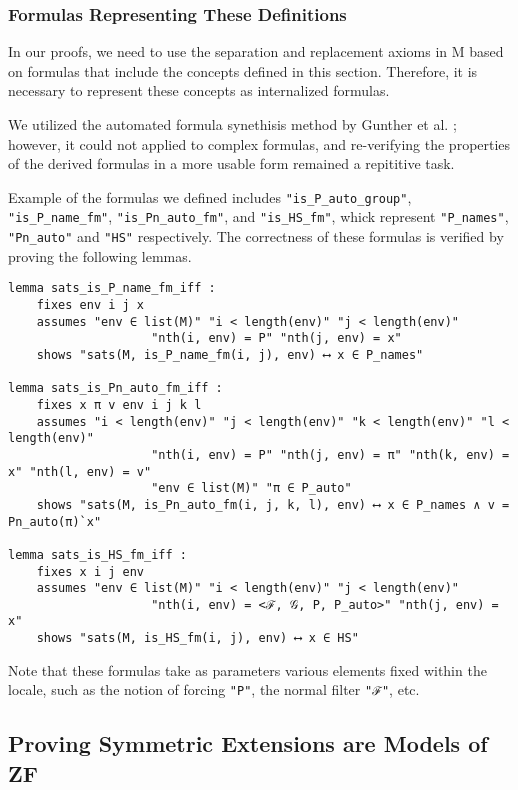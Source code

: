 \documentclass{report}
\newenvironment{isaframe}{\begin{mdframed}[topline=false, rightline=false, bottomline=false]}{\end{mdframed}}
\begin{document}
\subsubsection{Formulas Representing These Definitions}
In our proofs, we need to use the separation and replacement axioms in M
based on formulas that include the concepts defined in this section.
Therefore, it is necessary to represent these concepts as internalized formulas.

We utilized the automated formula synethisis method by Gunther et al. \cite{gunther_forcing};
however, it could not applied to complex formulas, 
and re-verifying the properties of the derived formulas in a more usable form remained a repititive task.

Example of the formulas we defined includes \texttt{"is\_P\_auto\_group"}, \texttt{"is\_P\_name\_fm"}, \texttt{"is\_Pn\_auto\_fm"}, and \texttt{"is\_HS\_fm"},
whick represent \texttt{"P\_names"}, \texttt{"Pn\_auto"} and \texttt{"HS"} respectively.
The correctness of these formulas is verified by proving the following lemmas. 

\begin{isaframe}
\begin{verbatim}
lemma sats_is_P_name_fm_iff : 
    fixes env i j x 
    assumes "env ∈ list(M)" "i < length(env)" "j < length(env)" 
                    "nth(i, env) = P" "nth(j, env) = x"  
    shows "sats(M, is_P_name_fm(i, j), env) ⟷ x ∈ P_names" 

lemma sats_is_Pn_auto_fm_iff :
    fixes x π v env i j k l
    assumes "i < length(env)" "j < length(env)" "k < length(env)" "l < length(env)" 
                    "nth(i, env) = P" "nth(j, env) = π" "nth(k, env) = x" "nth(l, env) = v" 
                    "env ∈ list(M)" "π ∈ P_auto" 
    shows "sats(M, is_Pn_auto_fm(i, j, k, l), env) ⟷ x ∈ P_names ∧ v = Pn_auto(π)`x" 

lemma sats_is_HS_fm_iff : 
    fixes x i j env 
    assumes "env ∈ list(M)" "i < length(env)" "j < length(env)" 
                    "nth(i, env) = <ℱ, 𝒢, P, P_auto>" "nth(j, env) = x" 
    shows "sats(M, is_HS_fm(i, j), env) ⟷ x ∈ HS" 
\end{verbatim}
\end{isaframe}

Note that these formulas take as parameters various elements fixed within the locale, 
such as the notion of forcing \texttt{"P"}, the normal filter \texttt{"ℱ"}, etc.


\subsection{Proving Symmetric Extensions are Models of ZF}
\end{document}
